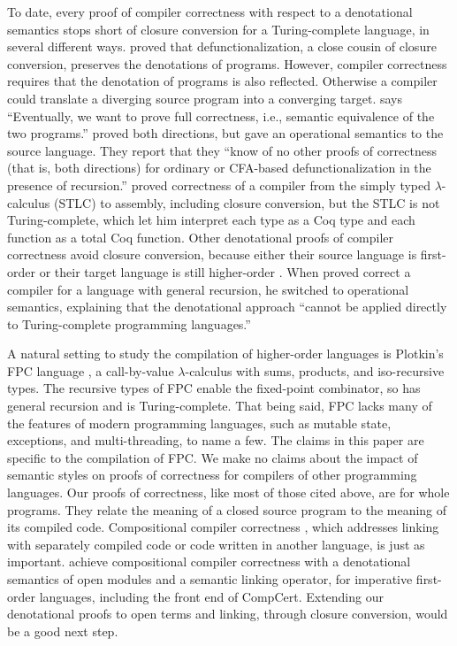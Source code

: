 To date, every proof of compiler correctness with respect to a
denotational semantics stops short of closure conversion for a
Turing-complete language, in several different ways.
\citet{Nielsen:2000aa} proved that defunctionalization, a close cousin
of closure conversion, preserves the denotations of programs. However,
compiler correctness requires that the denotation of programs is also
reflected. Otherwise a compiler could translate a
diverging source program into a converging target.
\citet{Nielsen:2000aa} says ``Eventually, we want to prove full
correctness, i.e., semantic equivalence of the two programs.''
%
\citet{Banerjee:2001aa} proved both directions, but gave an
operational semantics to the source language. They report that they
``know of no other proofs of correctness (that is, both directions)
for ordinary or CFA-based defunctionalization in the presence of
recursion.''
%
\citet{Chlipala:2007fk} proved correctness of a compiler from the
simply typed $\lambda$-calculus (STLC) to assembly, including closure
conversion, but the STLC is not Turing-complete, which let him
interpret each type as a Coq type and each function as a total Coq
function.
%
Other denotational proofs of compiler correctness avoid closure
conversion, because either their source language is first-order
\citep{Polak:1981aa,Xia:2019aa,Cheng:2026aa} or their target language
is still higher-order \citep{Clinger:1984aa,Schweimeier:1999aa,Benton:2009aa}. When
\citet{Chlipala:2010aa} proved correct a compiler for a language with
general recursion, he switched to operational semantics, explaining
that the denotational approach ``cannot be applied directly to
Turing-complete programming languages.''

A natural setting to study the compilation of higher-order languages
is Plotkin's FPC language \citep{Plotkin:1985aa}, a call-by-value
$\lambda$-calculus with sums, products, and iso-recursive types. The
recursive types of FPC enable the fixed-point combinator, so \fpc{}
has general recursion and is Turing-complete.  That being said, FPC
lacks many of the features of modern programming languages, such as
mutable state, exceptions, and multi-threading, to name a few. The
claims in this paper are specific to the compilation of FPC. We make
no claims about the impact of semantic styles on proofs of correctness
for compilers of other programming languages.  Our proofs of
correctness, like most of those cited above, are for whole
programs. They relate the meaning of a closed source program to the
meaning of its compiled code. Compositional compiler correctness
\citep{Perconti:2014aa,Stewart:2015ab,Ramananandro:2015aa}, which
addresses linking with separately compiled code or code written in
another language, is just as important.
\citet{Cheng:2026aa} achieve compositional compiler correctness with a
denotational semantics of open modules and a semantic linking
operator, for imperative first-order languages, including the front end
of CompCert. Extending our denotational proofs to open terms and
linking, through closure conversion, would be a good next step.

